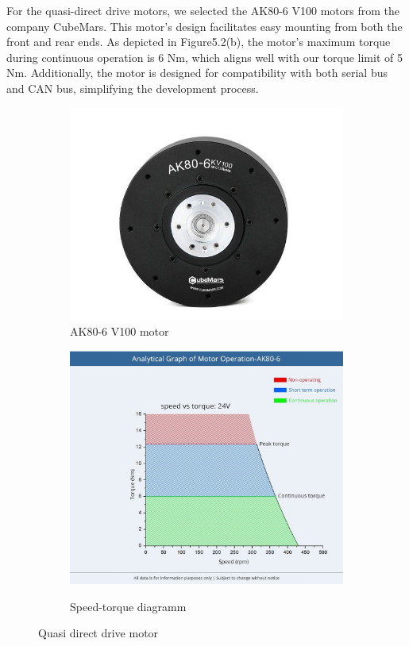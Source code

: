 For the quasi-direct drive motors, we selected the AK80-6 V100 motors from the company CubeMars. This motor's design facilitates easy mounting from both the front and rear ends. As depicted in Figure5.2(b), the motor's maximum torque during continuous operation is 6 Nm, which aligns well with our torque limit of 5 Nm. Additionally, the motor is designed for compatibility with both serial bus and CAN bus, simplifying the development process.


\begin{figure}[htbp]
  \centering
  \begin{subfigure}[b]{0.45\textwidth}
    \centering
    \includegraphics[width=\textwidth]{figures/hardware_setup/motor.jpg}
    \caption{AK80-6 V100 motor}
    \label{fig:subfiga}
  \end{subfigure}
  \hfill
  \begin{subfigure}[b]{0.45\textwidth}
    \centering
    \includegraphics[width=\textwidth]{figures/hardware_setup/torque_speed_curve.jpg}
    \label{fig:subfigb}
    \caption{Speed-torque diagramm}
  \end{subfigure}
  \caption{Quasi direct drive motor}
  \label{fig:twosubfigures}
\end{figure}

